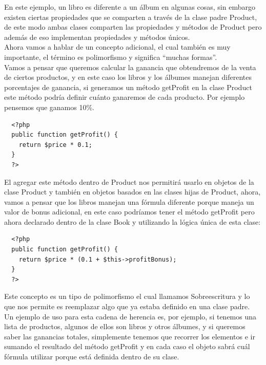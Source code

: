 \documentclass{article}
\begin{document}
En este ejemplo, un libro es diferente a un álbum en algunas cosas, sin embargo
existen ciertas propiedades que se comparten a través de la clase padre
Product, de este modo ambas clases comparten las propiedades y métodos de
Product pero además de eso implementan propiedades y métodos únicos.\\

Ahora vamos a hablar de un concepto adicional, el cual también es muy
importante, el término es polimorfismo y significa “muchas formas”.\\

Vamos a pensar que queremos calcular la ganancia que obtendremos de la venta de
ciertos productos, y en este caso los libros y los álbumes manejan diferentes
porcentajes de ganancia, si generamos un método getProfit en la clase Product
este método podría definir cuánto ganaremos de cada producto. Por ejemplo
pensemos que ganamos 10\%.\\

\begin{verbatim}
  <?php
  public function getProfit() {
    return $price * 0.1;
  }
  ?>
\end{verbatim}

El agregar este método dentro de Product nos permitirá usarlo en objetos de la
clase Product y también en objetos basados en las clases hijas de Product,
ahora, vamos a pensar que los libros manejan una fórmula diferente porque
maneja un valor de bonus adicional, en este caso podríamos tener el método
getProfit pero ahora declarado dentro de la clase Book y utilizando la lógica
única de esta clase:\\

\begin{verbatim}
  <?php
  public function getProfit() {
    return $price * (0.1 + $this->profitBonus);
  }
  ?>
\end{verbatim}

Este concepto es un tipo de polimorfismo el cual llamamos Sobreescritura y lo
que nos permite es reemplazar algo que ya estaba definido en una clase padre.\\

Un ejemplo de uso para esta cadena de herencia es, por ejemplo, si tenemos una
lista de productos, algunos de ellos son libros y otros álbumes, y si queremos
saber las ganancias totales, simplemente tenemos que recorrer los elementos e
ir sumando el resultado del método getProfit y en cada caso el objeto sabrá
cuál fórmula utilizar porque está definida dentro de su clase.\\
\end{document}
